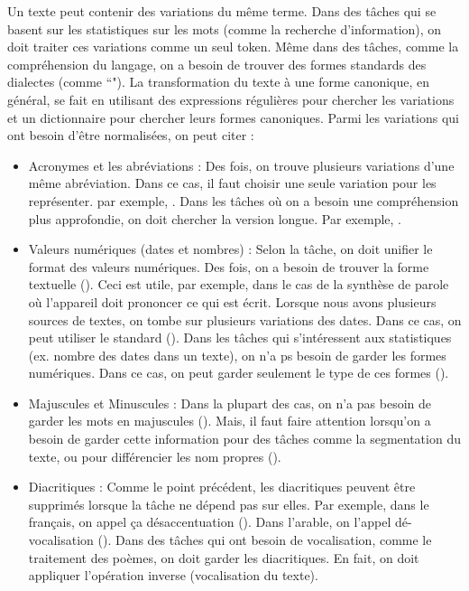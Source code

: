 \documentclass{KodeBook}
\begin{document}
Un texte peut contenir des variations du même terme. 
Dans des tâches qui se basent sur les statistiques sur les mots (comme la recherche d'information), on doit traiter ces variations comme un seul token. 
Même dans des tâches, comme la compréhension du langage, on a besoin de trouver des formes standards des dialectes (comme ``").
La transformation du texte à une forme canonique, en général, se fait en utilisant des expressions régulières pour chercher les variations et un dictionnaire pour chercher leurs formes canoniques. 
Parmi les variations qui ont besoin d'être normalisées, on peut citer :
\begin{itemize}
	\item Acronymes et les abréviations : Des fois, on trouve plusieurs variations d'une même abréviation.
	Dans ce cas, il faut choisir une seule variation pour les représenter. 
	par exemple, .
	Dans les tâches où on a besoin une compréhension plus approfondie, on doit chercher la version longue. 
	Par exemple, .
	
	\item Valeurs numériques (dates et nombres) : 
	Selon la tâche, on doit unifier le format des valeurs numériques. 
	Des fois, on a besoin de trouver la forme textuelle (). 
	Ceci est utile, par exemple, dans le cas de la synthèse de parole où l'appareil doit prononcer ce qui est écrit.
	Lorsque nous avons plusieurs sources de textes, on tombe sur plusieurs variations des dates. 
	Dans ce cas, on peut utiliser le standard  ().
	Dans les tâches qui s'intéressent aux statistiques (ex. nombre des dates dans un texte), on n'a ps besoin de garder les formes numériques. 
	Dans ce cas, on peut garder seulement le type de ces formes ().
	
	\item Majuscules et Minuscules : Dans la plupart des cas, on n'a pas besoin de garder les mots en majuscules (). 
	Mais, il faut faire attention lorsqu'on a besoin de garder cette information pour des tâches comme la segmentation du texte, ou pour différencier les nom propres ().
	
	\item Diacritiques : Comme le point précédent, les diacritiques peuvent être supprimés lorsque la tâche ne dépend pas sur elles. 
	Par exemple, dans le français, on appel ça désaccentuation ().
	Dans l'arable, on l'appel dé-vocalisation (). 
	Dans des tâches qui ont besoin de vocalisation, comme le traitement des poèmes, on doit garder les diacritiques. 
	En fait, on doit appliquer l'opération inverse (vocalisation du texte).
	

\end{itemize}
\end{document}
